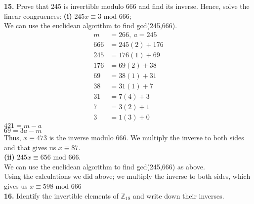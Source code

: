 \documentclass[paper=letter, fontsize=11pt]{scrartcl} %
\begin{document}
\textbf{15.} Prove that 245 is invertible modulo 666 and find its inverse. Hence, solve 
the linear congruences:
\textbf{(i)} $245x \equiv 3 \text{ mod } 666$; \\

We can use the euclidean algorithm to find gcd(245,666). \\
\begin{align*}
    m &= 266, \ a = 245 \\
    666 &= 245(2) + 176 \\
    245 &= 176(1) + 69 \\
    176 &= 69(2) + 38 \\
    69 &= 38(1) + 31 \\
    38 &= 31(1) + 7 \\
    31 &= 7(4) + 3 \\
    7 &= 3(2) + 1 \\
    3 &= 1(3) + 0
\end{align*}
$421 = m - a$ \\
$69 = 3a - m$ \\
Thus, $x \equiv 473$ is the inverse modulo $666$. We multiply the inverse to both sides
and that gives us $x \equiv 87$.
\\

\textbf{(ii)} $245x \equiv 656 \text{ mod } 666$. \\

We can use the euclidean algorithm to find gcd(245,666) as above.\\
Using the calculations we did above; we multiply the inverse to both sides, which 
gives us $x \equiv 598 \text{ mod } 666$
\\

\textbf{16.} Identify the invertible elements of $\mathbb{Z}_{18}$ and write down their
inverses. \\
\end{document}

